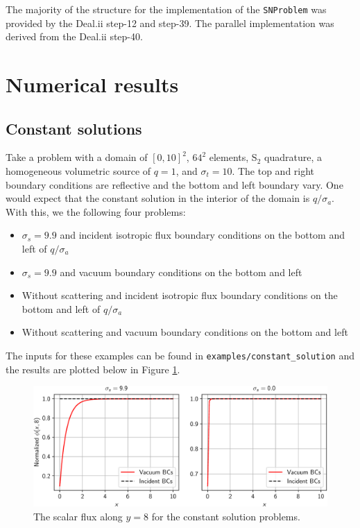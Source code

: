 \documentclass{article}
\begin{document}
The majority of the structure for the implementation of the \texttt{SNProblem} was provided by the Deal.ii step-12 and step-39. The parallel implementation was derived from the Deal.ii step-40.

\section{Numerical results}

\subsection{Constant solutions}

Take a problem with a domain of $[0, 10]^2$, $64^2$ elements, S$_2$ quadrature, a homogeneous volumetric source of $q = 1$, and $\sigma_t = 10$. The top and right boundary conditions are reflective and the bottom and left boundary vary. One would expect that the constant solution in the interior of the domain is $q / \sigma_a$. With this, we the following four problems:
\begin{itemize}
	\item $\sigma_s = 9.9$ and incident isotropic flux boundary conditions on the bottom and left of $q / \sigma_a$
	\item $\sigma_s = 9.9$ and vacuum boundary conditions on the bottom and left
	\item Without scattering and incident isotropic flux boundary conditions on the bottom and left of $q / \sigma_a$
	\item Without scattering and vacuum boundary conditions on the bottom and left
\end{itemize}

The inputs for these examples can be found in \texttt{examples/constant\_solution} and the results are plotted below in Figure \ref{fig:constant}.

\begin{figure}[H]
	\centering
	\includegraphics[width=0.9\linewidth]{images/constant_solution}
	\caption{The scalar flux along $y = 8$ for the constant solution problems.}
	\label{fig:constant}
\end{figure}
\end{document}
